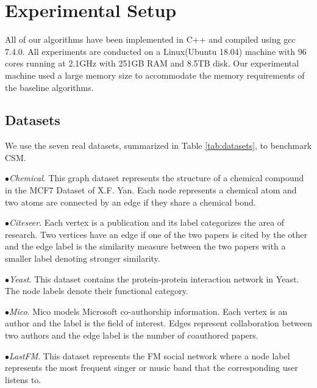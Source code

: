 \section{Experimental Setup}
\label{sec:setup}
All of our algorithms have been implemented in C++ and compiled using gcc 7.4.0. All experiments are conducted on a Linux(Ubuntu 18.04) machine with 96 cores running at 2.1GHz with 251GB RAM and 8.5TB disk. Our experimental machine used a large memory size to accommodate the memory requirements of the baseline algorithms. %

\subsection{Datasets} 
\label{ref:datasets}

We use the seven real datasets, summarized in Table \ref{tab:datasets}, to benchmark CSM.

$\bullet${\textit{Chemical}\cite{}}. This graph dataset represents the structure of a chemical compound in the MCF7 Dataset of X.F. Yan\cite{YH02}.%
Each node represents a chemical atom and two atoms are connected by an edge if they share a chemical bond.

$\bullet${\textit{Citeseer}\cite{}}. Each vertex is a publication and its label categorizes the area of research. Two vertices have an edge if one of the two papers is cited by the other and the edge label is the similarity measure between the two papers with a smaller label denoting stronger similarity. %

$\bullet${\textit{Yeast}\cite{}}. This dataset contains the protein-protein interaction network in Yeast. The node labels denote their functional category.%

$\bullet${\textit{Mico}\cite{}}. Mico models Microsoft co-authorship information. Each vertex is an author and the label is the field of interest. Edges represent collaboration between two authors and the edge label is the number of coauthored papers. %

$\bullet${\textit{LastFM}\cite{}}. This dataset represents the FM social network where a node label represents the most frequent singer or music band that the corresponding user listens to. %

